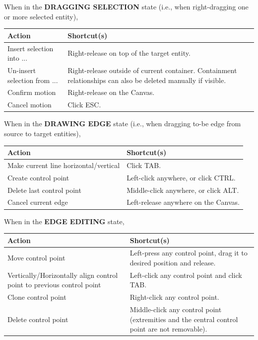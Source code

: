 \documentclass{article}
\numberwithin{equation}{section}
\numberwithin{figure}{section}
\begin{document}
When in the \textbf{DRAGGING SELECTION} state (i.e., when right-dragging one or more selected entity),\\

\begin{tabular}{| p{6cm}  p{10cm} |}
	\hline
	\textbf{Action} 				& \textbf{Shortcut(s)} \\ \hline \hline
	Insert selection into ...		& Right-release on top of the target entity. \\
	Un-insert selection from ...	& Right-release outside of current container. Containment relationships can also be deleted manually if visible. \\
	Confirm motion					& Right-release on the Canvas. \\
	Cancel motion 					& Click ESC. \\
	\hline
\end{tabular}
\vspace*{2em}


When in the \textbf{DRAWING EDGE} state (i.e., when dragging to-be edge from source to target entities),\\

\begin{tabular}{| p{6cm}  p{10cm} |}
	\hline
	\textbf{Action} 				& \textbf{Shortcut(s)} \\ \hline \hline
	Make current line horizontal/vertical	& Click TAB. \\
	Create control point 			& Left-click anywhere, or click CTRL. \\
	Delete last control point 		& Middle-click anywhere, or click ALT. \\
	Cancel current edge				& Left-release anywhere on the Canvas.\\
	\hline
\end{tabular}
\vspace*{2em}


When in the \textbf{EDGE EDITING} state,\\

\begin{tabular}{| p{6cm}  p{10cm} |}
	\hline
	\textbf{Action} 				& \textbf{Shortcut(s)} \\ \hline \hline
	Move control point 				& Left-press any control point, drag it to desired position and release. \\
	Vertically/Horizontally align control point to previous control point & Left-click any control point and click TAB. \\
	Clone control point 			& Right-click any control point. \\
	Delete control point 			& Middle-click any control point (extremities and the central control point are not removable). \\
	\hline
\end{tabular}
\vspace*{2em}
\end{document}

